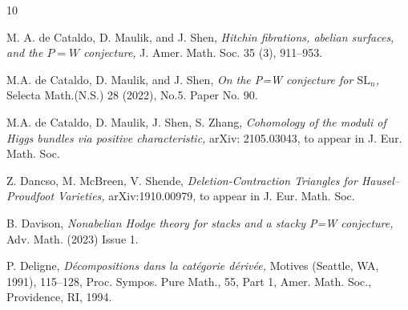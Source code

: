 \documentclass[11pt]{amsart}
\theoremstyle{plain}
\theoremstyle{definition}
\theoremstyle{remark}
\begin{document}
\begin{thebibliography}{10}








 M. A. de Cataldo, D. Maulik, and J. Shen, {\em Hitchin fibrations, abelian surfaces, and the $P=W$ conjecture,}  J. Amer. Math. Soc. 35 (3), 911--953.

 M.A. de Cataldo, D. Maulik, and J. Shen, {\em On the P=W conjecture for $\mathrm{SL}_n$,} Selecta Math.(N.S.) 28 (2022), No.5. Paper No. 90.

 M.A. de Cataldo, D. Maulik, J. Shen, S. Zhang, {\em Cohomology of the moduli of Higgs bundles via positive
characteristic,} arXiv: 2105.03043, to appear in J. Eur. Math. Soc.

 Z. Dancso, M. McBreen, V. Shende, {\em Deletion-Contraction Triangles for Hausel--Proudfoot Varieties,} arXiv:1910.00979, to appear in J. Eur. Math. Soc.

 B. Davison, {\em Nonabelian Hodge theory for stacks and a stacky P=W conjecture,} Adv. Math. (2023) Issue 1.




 P. Deligne, {\em D\'ecompositions dans la cat\'egorie d\'eriv\'ee,} Motives (Seattle, WA, 1991), 115--128, Proc. Sympos. Pure Math., 55, Part 1, Amer. Math. Soc., Providence, RI, 1994.



\end{thebibliography}
\end{document}
